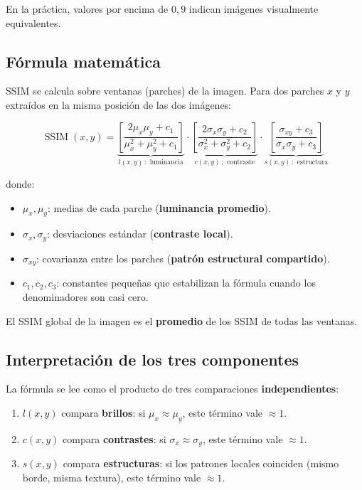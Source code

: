\documentclass[11pt,a4paper]{article}
\begin{document}
En la práctica, valores por encima de \(0{,}9\) indican imágenes visualmente
equivalentes.

\subsection{Fórmula matemática}

SSIM se calcula sobre ventanas (parches) de la imagen. Para dos parches \(x\) y
\(y\) extraídos en la misma posición de las dos imágenes:

\begin{equation}
    \boxed{\;
    \operatorname{SSIM}(x,y) =
    \underbrace{\left[\frac{2\mu_x \mu_y + c_1}{\mu_x^2 + \mu_y^2 + c_1}\right]}_{l(x,y)\,:\text{ luminancia}} \cdot
    \underbrace{\left[\frac{2\sigma_x \sigma_y + c_2}{\sigma_x^2 + \sigma_y^2 + c_2}\right]}_{c(x,y)\,:\text{ contraste}} \cdot
    \underbrace{\left[\frac{\sigma_{xy} + c_3}{\sigma_x \sigma_y + c_3}\right]}_{s(x,y)\,:\text{ estructura}}
    \;}
    \label{eq:ssim}
\end{equation}

donde:
\begin{itemize}
    \item \(\mu_x, \mu_y\): medias de cada parche (\textbf{luminancia promedio}).
    \item \(\sigma_x, \sigma_y\): desviaciones estándar (\textbf{contraste local}).
    \item \(\sigma_{xy}\): covarianza entre los parches (\textbf{patrón estructural compartido}).
    \item \(c_1, c_2, c_3\): constantes pequeñas que estabilizan la fórmula cuando los denominadores son casi cero.
\end{itemize}

El SSIM global de la imagen es el \textbf{promedio} de los SSIM de todas las
ventanas.

\subsection{Interpretación de los tres componentes}

La fórmula se lee como el producto de tres comparaciones \textbf{independientes}:

\begin{enumerate}
    \item \(l(x,y)\) compara \textbf{brillos}: si \(\mu_x \approx \mu_y\), este
          término vale \(\approx 1\).
    \item \(c(x,y)\) compara \textbf{contrastes}: si \(\sigma_x \approx \sigma_y\),
          este término vale \(\approx 1\).
    \item \(s(x,y)\) compara \textbf{estructuras}: si los patrones locales
          coinciden (mismo borde, misma textura), este término vale \(\approx 1\).
\end{enumerate}
\end{document}
